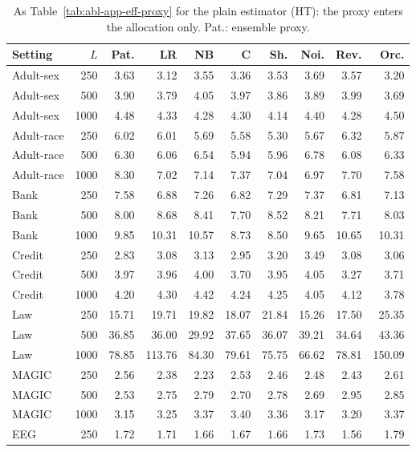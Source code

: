 \documentclass[pdflatex,sn-mathphys-num,iicol]{sn-jnl}
\theoremstyle{thmstyleone}
\theoremstyle{thmstyletwo}
\theoremstyle{thmstylethree}
\begin{document}
\begin{table}[t]
\centering\scriptsize
\caption{As Table~\ref{tab:abl-app-eff-proxy} for the plain estimator (HT): the proxy enters the allocation only. Pat.: ensemble proxy.}
\label{tab:abl-app-eff-proxy-ht}
\setlength{\tabcolsep}{4pt}
\begin{tabular}{lrrrrrrrrr}
\toprule
Setting & $L$ & Pat. & LR & NB & C & Sh. & Noi. & Rev. & Orc. \\
\midrule
Adult-sex & 250 & 3.63 & 3.12 & 3.55 & 3.36 & 3.53 & 3.69 & 3.57 & 3.20 \\
Adult-sex & 500 & 3.90 & 3.79 & 4.05 & 3.97 & 3.86 & 3.89 & 3.99 & 3.69 \\
Adult-sex & 1000 & 4.48 & 4.33 & 4.28 & 4.30 & 4.14 & 4.40 & 4.28 & 4.50 \\
Adult-race & 250 & 6.02 & 6.01 & 5.69 & 5.58 & 5.30 & 5.67 & 6.32 & 5.87 \\
Adult-race & 500 & 6.30 & 6.06 & 6.54 & 5.94 & 5.96 & 6.78 & 6.08 & 6.33 \\
Adult-race & 1000 & 8.30 & 7.02 & 7.14 & 7.37 & 7.04 & 6.97 & 7.70 & 7.58 \\
Bank & 250 & 7.58 & 6.88 & 7.26 & 6.82 & 7.29 & 7.37 & 6.81 & 7.13 \\
Bank & 500 & 8.00 & 8.68 & 8.41 & 7.70 & 8.52 & 8.21 & 7.71 & 8.03 \\
Bank & 1000 & 9.85 & 10.31 & 10.57 & 8.73 & 8.50 & 9.65 & 10.65 & 10.31 \\
Credit & 250 & 2.83 & 3.08 & 3.13 & 2.95 & 3.20 & 3.49 & 3.08 & 3.06 \\
Credit & 500 & 3.97 & 3.96 & 4.00 & 3.70 & 3.95 & 4.05 & 3.27 & 3.71 \\
Credit & 1000 & 4.20 & 4.30 & 4.42 & 4.24 & 4.25 & 4.05 & 4.12 & 3.78 \\
Law & 250 & 15.71 & 19.71 & 19.82 & 18.07 & 21.84 & 15.26 & 17.50 & 25.35 \\
Law & 500 & 36.85 & 36.00 & 29.92 & 37.65 & 36.07 & 39.21 & 34.64 & 43.36 \\
Law & 1000 & 78.85 & 113.76 & 84.30 & 79.61 & 75.75 & 66.62 & 78.81 & 150.09 \\
MAGIC & 250 & 2.56 & 2.38 & 2.23 & 2.53 & 2.46 & 2.48 & 2.43 & 2.61 \\
MAGIC & 500 & 2.53 & 2.75 & 2.79 & 2.70 & 2.78 & 2.69 & 2.95 & 2.85 \\
MAGIC & 1000 & 3.15 & 3.25 & 3.37 & 3.40 & 3.36 & 3.17 & 3.20 & 3.37 \\
EEG & 250 & 1.72 & 1.71 & 1.66 & 1.67 & 1.66 & 1.73 & 1.56 & 1.79 \\

\end{tabular}
\end{table}
\end{document}
